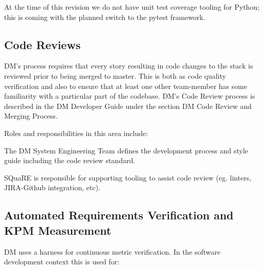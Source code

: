 At the time of this revision we do not have unit test coverage tooling for Python; this is coming with the planned switch to the pytest framework. 

\subsection{Code Reviews}

DM’s process requires that every story resulting in code changes to the stack is reviewed prior to being merged to master. This is both as code quality verification and also to ensure that at least one other team-member has some familiarity with a particular part of the codebase. DM’s Code Review process is described in the DM Developer Guide under the section DM Code Review and Merging Process.

Roles and responsibilities in this area include:

\begin{itemize_single}

\item The DM System Engineering Team  defines the development process and style guide including the code review standard.

\item SQuaRE is responsible for supporting tooling to assist code review (eg. linters, JIRA-Github integration, etc). 

\end{itemize_single}
  
\subsection{Automated Requirements Verification and KPM Measurement}

DM uses a harness for continuous metric verification. In the software development context this is used for:

